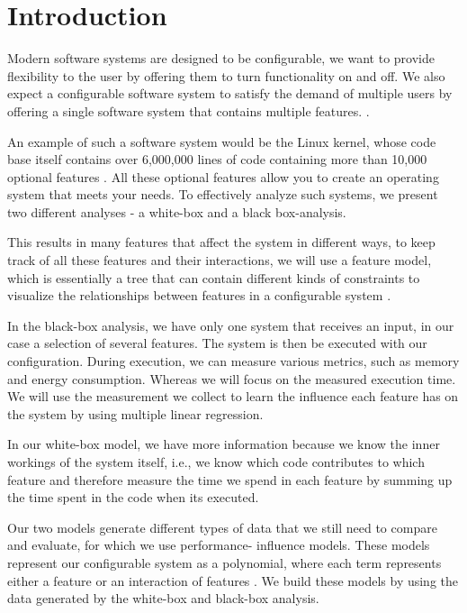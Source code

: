 \chapter{Introduction}\label{ch:introduction}

Modern software systems are designed to be configurable, we want to provide flexibility to the user by offering them to turn functionality on 
and off. 
We also expect a configurable software system to satisfy the demand of multiple users by offering a single software system that 
contains multiple features. \cite{Feature-Oriented-Software-Product-Lines}. 

An example of such a software system would be the Linux kernel, whose code base itself contains over 6,000,000 lines of code containing more 
than 10,000 optional features \cite{Linux-Kernel}. 
All these optional features allow you to create an operating system that meets your needs. To effectively analyze such systems,
we present two different analyses - a white-box and a black box-analysis.

This results in many features that affect the system in different ways, to keep track of all these features and their interactions,
we will use a feature model, which is essentially a tree that can contain different kinds of constraints to visualize the relationships 
between features in a configurable system \cite{Feature-Oriented-Software-Product-Lines}.

In the black-box analysis, we have only one system that receives an input, in our case a selection of several features.
The system is then be executed with our configuration. During execution, we can measure various metrics, such as memory and energy
consumption. Whereas we will focus on the measured execution time. We will use the measurement we collect to learn the influence
each feature has on the system by using multiple linear regression.

In our white-box model, we have more information because we know the inner workings of the
system itself, i.e., we know which code contributes to which feature and therefore measure the time we spend in each feature by summing
up the time spent in the code when its executed.

Our two models generate different types of data that we still need to compare and evaluate, for which we use performance-
influence models. These models represent our configurable system as a polynomial, where each term represents either a feature or an 
interaction of features \cite{Performance-influence-models-for-highly-configurable-systems}. We build these models by using the data generated 
by the white-box and black-box analysis.

